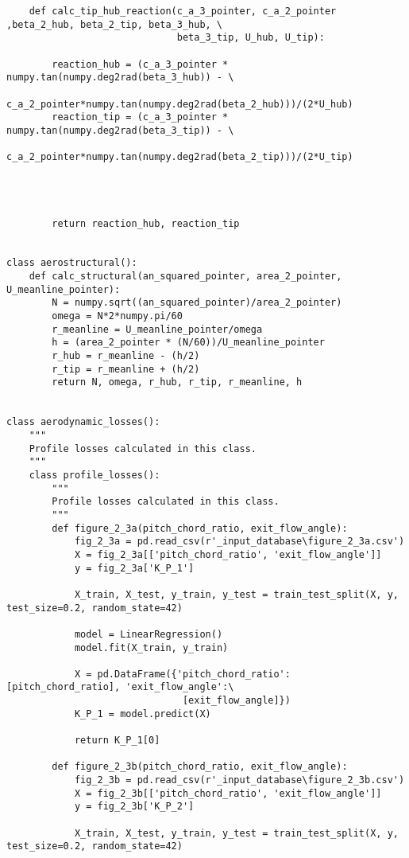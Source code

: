 \begin{verbatim}
    def calc_tip_hub_reaction(c_a_3_pointer, c_a_2_pointer ,beta_2_hub, beta_2_tip, beta_3_hub, \
                              beta_3_tip, U_hub, U_tip):

        reaction_hub = (c_a_3_pointer * numpy.tan(numpy.deg2rad(beta_3_hub)) - \
                        c_a_2_pointer*numpy.tan(numpy.deg2rad(beta_2_hub)))/(2*U_hub)
        reaction_tip = (c_a_3_pointer * numpy.tan(numpy.deg2rad(beta_3_tip)) - \
                        c_a_2_pointer*numpy.tan(numpy.deg2rad(beta_2_tip)))/(2*U_tip)




        return reaction_hub, reaction_tip
    

class aerostructural():
    def calc_structural(an_squared_pointer, area_2_pointer, U_meanline_pointer):
        N = numpy.sqrt((an_squared_pointer)/area_2_pointer)
        omega = N*2*numpy.pi/60
        r_meanline = U_meanline_pointer/omega
        h = (area_2_pointer * (N/60))/U_meanline_pointer
        r_hub = r_meanline - (h/2)
        r_tip = r_meanline + (h/2)
        return N, omega, r_hub, r_tip, r_meanline, h
    

class aerodynamic_losses():
    """
    Profile losses calculated in this class.
    """
    class profile_losses():
        """
        Profile losses calculated in this class.
        """
        def figure_2_3a(pitch_chord_ratio, exit_flow_angle):
            fig_2_3a = pd.read_csv(r'_input_database\figure_2_3a.csv')
            X = fig_2_3a[['pitch_chord_ratio', 'exit_flow_angle']]
            y = fig_2_3a['K_P_1']

            X_train, X_test, y_train, y_test = train_test_split(X, y, test_size=0.2, random_state=42)

            model = LinearRegression()
            model.fit(X_train, y_train)

            X = pd.DataFrame({'pitch_chord_ratio': [pitch_chord_ratio], 'exit_flow_angle':\
                               [exit_flow_angle]})
            K_P_1 = model.predict(X)
            
            return K_P_1[0]
    
        def figure_2_3b(pitch_chord_ratio, exit_flow_angle):
            fig_2_3b = pd.read_csv(r'_input_database\figure_2_3b.csv')
            X = fig_2_3b[['pitch_chord_ratio', 'exit_flow_angle']]
            y = fig_2_3b['K_P_2']

            X_train, X_test, y_train, y_test = train_test_split(X, y, test_size=0.2, random_state=42)


\end{verbatim}
